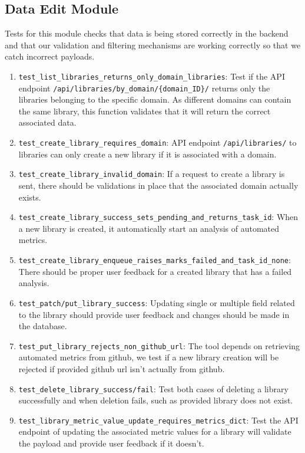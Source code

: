 \documentclass[12pt, titlepage]{article}
\begin{document}
\subsection{Data Edit Module}
  Tests for this module checks that data is being stored correctly in the backend and that our validation and filtering mechanisms are working correctly so that we catch incorrect payloads.
  \begin{enumerate}
    \item \texttt{test\_list\_libraries\_returns\_only\_domain\_libraries}: Test if the API endpoint \texttt{/api/libraries/by\_domain/\{domain\_ID\}/} returns only the libraries belonging to the specific domain. As different domains can contain the same library, this function validates that it will return the correct associated data.
    \item \texttt{test\_create\_library\_requires\_domain}: API endpoint \texttt{/api/libraries/} to libraries can only create a new library if it is associated with a domain.
    \item \texttt{test\_create\_library\_invalid\_domain}: If a request to create a library is sent, there should be validations in place that the associated domain actually exists.
    \item \texttt{test\_create\_library\_success\_sets\_pending\_and\_returns\_task\_id}: When a new library is created, it automatically start an analysis of automated metrics.
    \item \texttt{test\_create\_library\_enqueue\_raises\_marks\_failed\_and\_task\_id\_none}: There should be proper user feedback for a created library that has a failed analysis.
    \item \texttt{test\_patch/put\_library\_success}: Updating single or multiple field related to the library should provide user feedback and changes should be made in the database.
    \item \texttt{test\_put\_library\_rejects\_non\_github\_url}: The tool depends on retrieving automated metrics from github, we test if a new library creation will be rejected if provided github url isn't actually from github.
    \item \texttt{test\_delete\_library\_success/fail}: Test both cases of deleting a library successfully and when deletion fails, such as provided library does not exist.
    \item \texttt{test\_library\_metric\_value\_update\_requires\_metrics\_dict}: Test the API endpoint of updating the associated metric values for a library will validate the payload and provide user feedback if it doesn't.

\end{enumerate}
\end{document}
